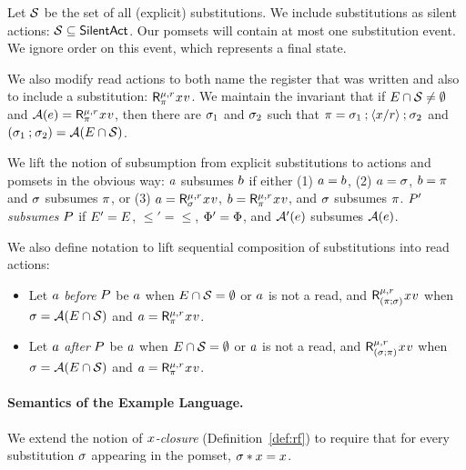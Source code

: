 Let $\mathcal{S}$ be the set of all (explicit) substitutions.  We include
substitutions as silent actions: $\mathcal{S}\subseteq\mathsf{SilentAct}$.
Our pomsets will contain at most one substitution event.  We ignore order on
this event, which represents a final state.

We also modify read actions to both name the register that was written
and also to include a substitution:
$\DRreg[\amode]{\aReg}{\bSub}{\aLoc}{\aVal}$.
We maintain the invariant that if
$E\cap\mathcal{S}\neq\emptyset$ and 
$\labelingAct(\aEv)=\DRreg[\amode]{\aReg}{\bSub}{\aLoc}{\aVal}$, 
then
there are $\sigma_1$ and $\sigma_2$ such that $\pi=\sigma_1\mathbin{;}\langle x/r\rangle\mathbin{;}\sigma_2$ and
$(\sigma_1\mathbin{;}\sigma_2) = \mathcal{A}(E\cap\mathcal{S})$.

We lift the notion of subsumption from explicit substitutions to actions and
pomsets in the obvious way: $a$ subsumes $b$ if either (1)
$a=b$, (2) $a=\sigma$, $b=\pi$ and $\sigma$ subsumes $\pi$,
or (3) $\aAct=\DRreg[\amode]{\aReg}{\aSub}{\aLoc}{\aVal}$,
$\bAct=\DRreg[\amode]{\aReg}{\bSub}{\aLoc}{\aVal}$, and $\sigma$ subsumes
$\pi$.
$P'$ \emph{subsumes} $P$ if $E'=E$, ${\le'}={\le}$,
$\Phi'=\Phi$, and $\mathcal{A}'(e)$
subsumes $\mathcal{A}(e)$. 

We also define notation to lift sequential composition of substitutions into
read actions:
\begin{itemize}
\item Let $a$ \emph{before} $P$ be $a$ when
  $E\cap\mathcal{S}=\emptyset$ or $a$ is not a read, and
  $\DRreg[\amode]{\aReg}{(\bSub\SUBSEQ\aSub)}{\aLoc}{\aVal}$ when
  $\sigma=\mathcal{A}(E\cap\mathcal{S})$ and
  $\aAct=\DRreg[\amode]{\aReg}{\bSub}{\aLoc}{\aVal}$.
\item 
  Let $a$ \emph{after} $P$ be $a$ when $E\cap\mathcal{S}=\emptyset$
  or $a$ is not a read, and
  $\DRreg[\amode]{\aReg}{(\aSub\SUBSEQ\bSub)}{\aLoc}{\aVal}$ when
  $\sigma=\mathcal{A}(E\cap\mathcal{S})$ and
  $\aAct=\DRreg[\amode]{\aReg}{\bSub}{\aLoc}{\aVal}$.
\end{itemize}
\paragraph{Semantics of the Example Language.}
We extend the notion of \emph{$x$-closure} (Definition~\ref{def:rf}) to
require that for every substitution $\sigma$ appearing in the pomset,
$\sigma\mathbin{\ast}x=x$.


